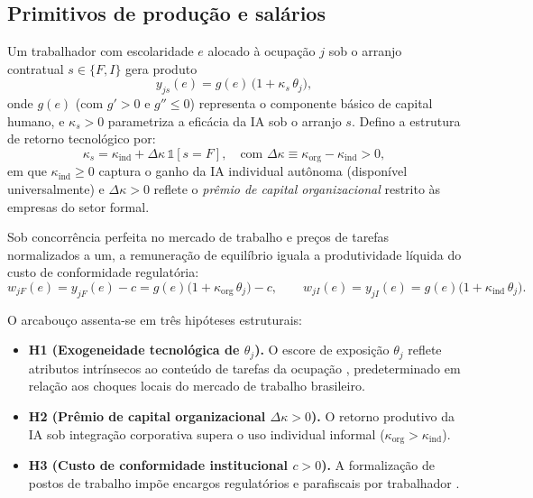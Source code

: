 \subsection{Primitivos de produção e salários}

Um trabalhador com escolaridade $e$ alocado à ocupação $j$ sob o arranjo contratual $s \in \{F, I\}$ gera produto
\begin{equation}
    y_{j s}(e) = g(e) \, \big(1 + \kappa_s \, \theta_j\big),
    \label{eq:produto}
\end{equation}
onde $g(e)$ (com $g' > 0$ e $g'' \le 0$) representa o componente básico de capital humano, e $\kappa_s > 0$ parametriza a eficácia da IA sob o arranjo $s$. Defino a estrutura de retorno tecnológico por:
\begin{equation}
    \kappa_s = \kappa_{\text{ind}} + \Delta\kappa \, \mathbb{1}[s = F], \quad \text{com } \Delta\kappa \equiv \kappa_{\text{org}} - \kappa_{\text{ind}} > 0,
\end{equation}
em que $\kappa_{\text{ind}} \ge 0$ captura o ganho da IA individual autônoma (disponível universalmente) e $\Delta\kappa > 0$ reflete o \emph{prêmio de capital organizacional} restrito às empresas do setor formal.

Sob concorrência perfeita no mercado de trabalho e preços de tarefas normalizados a um, a remuneração de equilíbrio iguala a produtividade líquida do custo de conformidade regulatória:
\begin{equation}
    w_{jF}(e) = y_{jF}(e) - c = g(e)\big(1 + \kappa_{\text{org}}\,\theta_j\big) - c, \qquad w_{jI}(e) = y_{jI}(e) = g(e)\big(1 + \kappa_{\text{ind}}\,\theta_j\big).
    \label{eq:salarios}
\end{equation}

\noindent O arcabouço assenta-se em três hipóteses estruturais:
\begin{itemize}
    \item \textbf{H1 (Exogeneidade tecnológica de $\theta_j$).} O escore de exposição $\theta_j$ reflete atributos intrínsecos ao conteúdo de tarefas da ocupação \citep{eloundou2024gpts}, predeterminado em relação aos choques locais do mercado de trabalho brasileiro.
    \item \textbf{H2 (Prêmio de capital organizacional $\Delta\kappa > 0$).} O retorno produtivo da IA sob integração corporativa supera o uso individual informal ($\kappa_{\text{org}} > \kappa_{\text{ind}}$).
    \item \textbf{H3 (Custo de conformidade institucional $c > 0$).} A formalização de postos de trabalho impõe encargos regulatórios e parafiscais por trabalhador \citep{ulyssea2018firms}.
\end{itemize}

